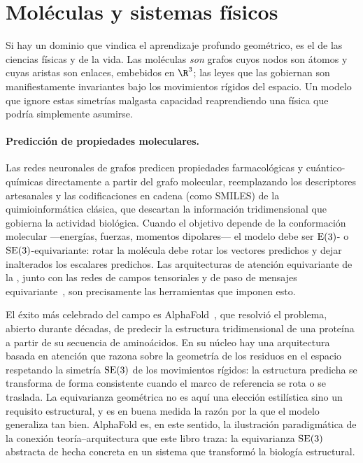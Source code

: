 \section{Mol\'eculas y sistemas f\'isicos}
\label{sec:apps:molecules}

Si hay un dominio que vindica el aprendizaje profundo geom\'etrico, es el de las
ciencias f\'isicas y de la vida. Las mol\'eculas \emph{son} grafos cuyos nodos
son \'atomos y cuyas aristas son enlaces, embebidos en $\R^3$; las leyes que las
gobiernan son manifiestamente invariantes bajo los movimientos r\'igidos del
espacio. Un modelo que ignore estas simetr\'ias malgasta capacidad reaprendiendo
una f\'isica que podr\'ia simplemente asumirse.

\paragraph{Predicci\'on de propiedades moleculares.}
Las redes neuronales de grafos predicen propiedades farmacol\'ogicas y
cu\'antico-qu\'imicas directamente a partir del grafo molecular, reemplazando los
descriptores artesanales y las codificaciones en cadena (como SMILES) de la
quimioinform\'atica cl\'asica, que descartan la informaci\'on tridimensional que
gobierna la actividad biol\'ogica. Cuando el objetivo depende de la
conformaci\'on molecular ---energ\'ias, fuerzas, momentos dipolares--- el modelo
debe ser $\mathrm{E}(3)$- o $\mathrm{SE}(3)$-equivariante: rotar la mol\'ecula debe rotar los
vectores predichos y dejar inalterados los escalares predichos. Las arquitecturas
de atenci\'on equivariante de la , junto con las redes
de campos tensoriales y de paso de mensajes
equivariante~\citep{satorras2021enequivariant}, son precisamente las
herramientas que imponen esto.

\begin{example}
\label{ex:apps:alphafold}
El \'exito m\'as celebrado del campo es
AlphaFold~\citep{jumper2021alphafold}, que resolvi\'o el problema, abierto
durante d\'ecadas, de predecir la estructura tridimensional de una prote\'ina a
partir de su secuencia de amino\'acidos. En su n\'ucleo hay una arquitectura
basada en atenci\'on que razona sobre la geometr\'ia de los residuos en el
espacio respetando la simetr\'ia $\mathrm{SE}(3)$ de los movimientos r\'igidos: la
estructura predicha se transforma de forma consistente cuando el marco de
referencia se rota o se traslada. La equivarianza geom\'etrica no es aqu\'i una
elecci\'on estil\'istica sino un requisito estructural, y es en buena medida la
raz\'on por la que el modelo generaliza tan bien. AlphaFold es, en este sentido,
la ilustraci\'on paradigm\'atica de la conexi\'on teor\'ia--arquitectura que este
libro traza: la equivarianza $\mathrm{SE}(3)$ abstracta de  hecha
concreta en un sistema que transform\'o la biolog\'ia estructural.
\end{example}


